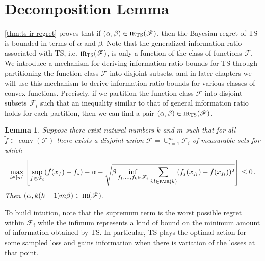 \documentclass[letter, 12pt]{report}
\newcommand{\pair}{\operatorname{\textsc{pair}}}
\newcommand{\sF}{\mathscr F}
\newcommand{\conv}{\operatorname{conv}}
\newcommand{\1}{\mathbf{1}}
\newcommand{\IR}{\operatorname{\textsc{ir}}}
\newcommand{\ts}{\textsc{TS}\xspace}
\theoremstyle{plain}
\newtheorem{lemma}[theorem]{Lemma}
\theoremstyle{definition}
\theoremstyle{remark}
\begin{document}
\section{Decomposition Lemma}
\cref{thm:ts-ir-regret} proves that if $(\alpha, \beta) \in \IR_\ts(\sF)$, then the Bayesian regret of \ts{} is bounded in terms of $\alpha$ and $\beta$.
Note that the generalized information ratio associated with \ts{}, i.e. $\IR_\ts(\sF)$, is only a function of the class of functions $\sF$.
We introduce a mechanism for deriving information ratio bounds for \ts{}
through partitioning the function class $\sF$ into disjoint subsets,
and in later chapters we will use this mechanism to derive information ratio bounds for various classes of convex functions.
Precisely, if we partition the function class $\sF$ into disjoint subsets $\sF_i$ such that an inequality similar to that of general information ratio holds for each partition, then we can find a pair $(\alpha, \beta) \in \IR_\ts(\sF)$.
\begin{lemma}\label{lem:decomp-big}
    Suppose there exist natural numbers $k$ and $m$ such that for all $\tilde f \in \conv(\sF)$ there exists a disjoint union $\sF = \cup_{i=1}^m \sF_i$ of measurable sets
    for which
    \begin{align*}
        \max_{i \in [m]} \left[\sup_{f \in \sF_i} (\tilde f(x_f) - f_\star) - \alpha - \sqrt{\beta \inf_{f_1,\ldots,f_k \in \sF_i} \sum_{j,l \in \pair(k)} (f_j(x_{f_l}) - \tilde f(x_{f_l}))^2} \right] \leq 0 \,.
    \end{align*}
    Then $(\alpha, k(k-1)m\beta) \in \IR(\sF)$.
\end{lemma}
To build intution, note that the supremum term is the worst possible regret within $\sF_i$ while the infimum represents a kind of bound on the minimum amount of information obtained by \ts{}.
In particular, \ts{} plays the optimal action for some sampled loss and gains information when there is variation of the losses at that point.
\end{document}
